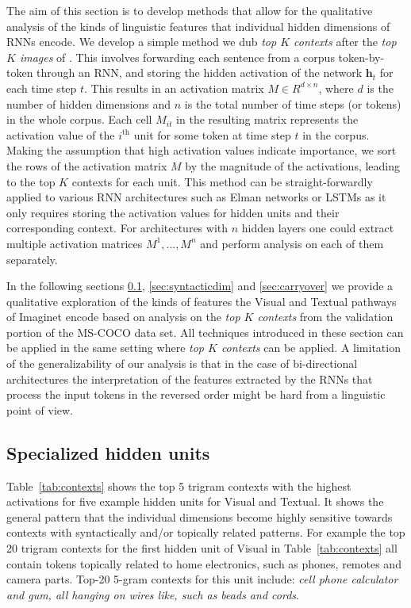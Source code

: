 The aim of this section is to develop methods that allow
for the qualitative analysis of the kinds of linguistic features
that individual hidden dimensions of RNNs encode. 
We develop a simple method we dub {\it top $K$ contexts} 
after the {\it top $K$ images} of .
This involves forwarding each sentence from a corpus token-by-token through 
an RNN, and storing the hidden activation of the network $\mathbf{h}_{t}$ 
for each time step $t$. This results in an activation 
matrix $M\in R^{d\times n}$, where
$d$ is the number of hidden dimensions and $n$ is the 
total number of time steps (or tokens) in the whole corpus. 
Each cell $M_{it}$ in the resulting matrix represents 
the activation value of the $i^{\text{th}}$ unit for some token at 
time step $t$ in the corpus. 
Making the assumption that high activation values indicate 
importance, we sort the rows of the activation matrix $M$ by the 
magnitude of the activations, leading to the top $K$ contexts for each unit.
This method can be straight-forwardly applied to various 
RNN architectures such as Elman networks or LSTMs 
as it only requires storing
the activation values for hidden units and their corresponding context.
For architectures with $n$ hidden layers
one could extract multiple activation matrices $M^{1}, \ldots, M^{n}$
and perform analysis on each of them separately.

In the following sections \ref{sec:topk}, \ref{sec:syntacticdim} and
\ref{sec:carryover} we provide a qualitative exploration of the kinds of
features the {\sc Visual} and {\sc Textual} pathways of {\sc Imaginet}
encode based on analysis on the {\it top $K$ contexts} from the validation portion of
the MS-COCO data set. All techniques introduced in these section can be applied
in the same setting where {\it top $K$ contexts} can be applied.
A limitation of the generalizability of our 
analysis is that in the case of 
bi-directional architectures the interpretation of the features
extracted by the RNNs that process the input tokens in the reversed order
might be hard from a linguistic point of view. 

\subsection{Specialized hidden units}
\label{sec:topk}

Table~\ref{tab:contexts} shows the top 5 trigram contexts with the
highest activations for five example hidden units for {\sc Visual}
and {\sc Textual}. It shows the general pattern that the individual
dimensions become highly sensitive towards contexts with syntactically
and/or topically related patterns. For example the top 20 trigram
contexts for the first hidden unit of {\sc Visual} in
Table~\ref{tab:contexts} all contain tokens topically  
related to home electronics, such as phones, remotes and camera parts. Top-20 
5-gram contexts for this unit include: {\it cell phone calculator and gum, 
all hanging on wires like, such as beads and cords}. 

